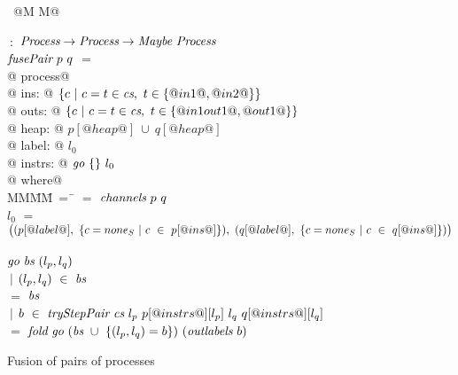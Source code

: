 
\begin{figure*}

\begin{tabbing}
~@M M@   \TABDEF \kill

 \> $~:$ \> $\textit{Process} \to \textit{Process} \to  \textit{Maybe}~\textit{Process}$ \\
$\textit{fusePair}~p~q$ \> $=$ \\
@    process@ \\
@        ins: @ $\{ c~|~c=t \in \textit{cs},~t \in \{ @in1@,@in2@ \} \} $ \\
@       outs: @ $\{ c~|~c=t \in \textit{cs},~t \in \{ @in1out1@,@out1@ \} \} $ \\
@       heap: @ $p[@heap@]~\cup~q[@heap@]$ \\
@      label: @ $l_0$ \\
@     instrs: @ $\textit{go}~\{  \}~l_0$ \\
@ where@ \\
MM\=MM\=~=~\=\kill
 \> \cs \> $=$ \> $\textit{channels}~p~q$ \\
 \> $l_0$   \> $=$ \> $
      \big( 
      (p[@label@],~\{ c=none_S~|~c~\in~p[@ins@] \}),~
      (q[@label@],~\{ c=none_S~|~c~\in~q[@ins@] \})
      \big)$ \\
 \\
 \> $\textit{go}~\textit{bs}~(l_p,l_q)$ \\
 \> \> $~|$ \> $(l_p,l_q)~\in~\textit{bs}$ \\
 \> \> $=$  \> $\textit{bs}$ \\
 \> \> $~|$ \>
        $b~\in~\textit{tryStepPair}~\textit{cs}~l_p~p[@instrs@][l_p]~l_q~q[@instrs@][l_q]$ \\ 
 \> \> $=$ \> $\textit{fold}~\textit{go}~(\textit{bs}~\cup~\{ (l_p,l_q)=b \})~(\textit{outlabels}~b)$
\end{tabbing}

\caption{Fusion of pairs of processes}


\label{fig:Fusion:Def:Top}
\end{figure*}



